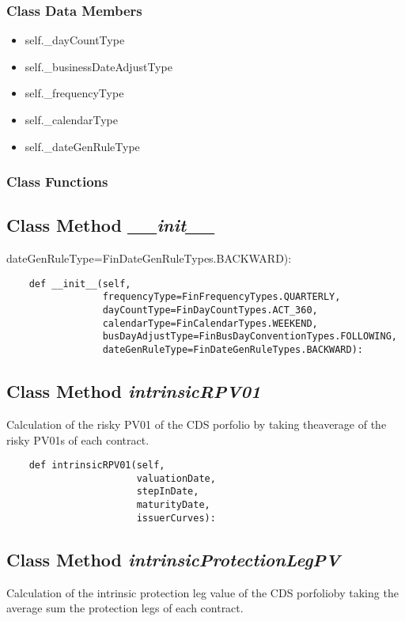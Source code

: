 \documentclass[twoside,11pt]{book}
\begin{document}
\subsubsection{Class Data Members}
\begin{itemize}
\item{self.\_dayCountType}
\item{self.\_businessDateAdjustType}
\item{self.\_frequencyType}
\item{self.\_calendarType}
\item{self.\_dateGenRuleType}
\end{itemize}

\subsubsection{Class Functions}

\subsection{Class Method {\it \_\_init\_\_}}
dateGenRuleType=FinDateGenRuleTypes.BACKWARD):

\begin{lstlisting}
    def __init__(self,
                 frequencyType=FinFrequencyTypes.QUARTERLY,
                 dayCountType=FinDayCountTypes.ACT_360,
                 calendarType=FinCalendarTypes.WEEKEND,
                 busDayAdjustType=FinBusDayConventionTypes.FOLLOWING,
                 dateGenRuleType=FinDateGenRuleTypes.BACKWARD):
\end{lstlisting}

\subsection{Class Method {\it intrinsicRPV01}}
Calculation of the risky PV01 of the CDS porfolio by taking theaverage of the risky PV01s of each contract. 

\begin{lstlisting}
    def intrinsicRPV01(self,
                       valuationDate,
                       stepInDate,
                       maturityDate,
                       issuerCurves):
\end{lstlisting}

\subsection{Class Method {\it intrinsicProtectionLegPV}}
Calculation of the intrinsic protection leg value of the CDS porfolioby taking the average sum the protection legs of each contract. 
\end{document}
